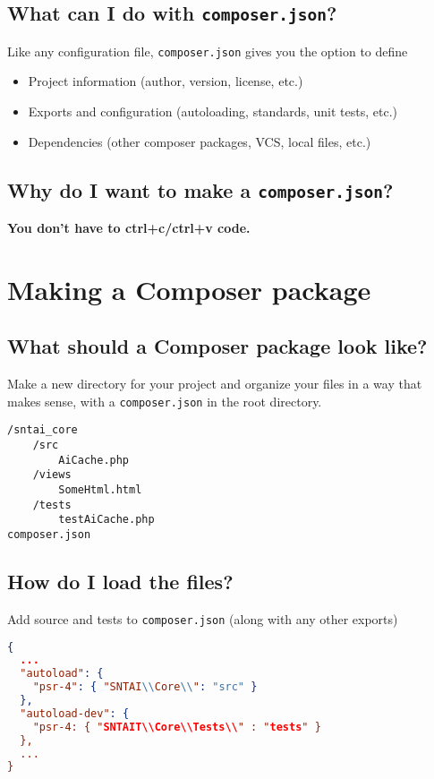 \documentclass[pdf]{beamer}
\newcommand{\com}[1]{\lstinline$#1$}
\begin{document}
\subsection{What can I do with \com{composer.json}?}
\begin{frame}
Like any configuration file, \com{composer.json} gives you the option to define
\begin{itemize}
\item Project information (author, version, license, etc.)
\item Exports and configuration (autoloading, standards, unit tests, etc.)
\item Dependencies (other composer packages, VCS, local files, etc.)
\end{itemize}
\end{frame}

\subsection{Why do I want to make a \com{composer.json}?}
\begin{frame}
\textbf{You don't have to ctrl+c/ctrl+v code.}
\end{frame}

\section{Making a Composer package}
\subsection{What should a Composer package look like?}
\begin{frame}[fragile]
Make a new directory for your project and organize your files in a way that makes sense, with a \com{composer.json} in the root directory.
\begin{lstlisting}
/sntai_core
	/src
		AiCache.php
	/views
		SomeHtml.html
	/tests
		testAiCache.php
composer.json
\end{lstlisting}
\end{frame}
\subsection{How do I load the files?}
\begin{frame}[fragile]
Add source and tests to \com{composer.json} (along with any other exports)
\begin{lstlisting}[language=json]
{
  ...
  "autoload": {
    "psr-4": { "SNTAI\\Core\\": "src" }
  },
  "autoload-dev": {
    "psr-4: { "SNTAIT\\Core\\Tests\\" : "tests" }
  },
  ...
}
\end{lstlisting}
\end{frame}
\end{document}
